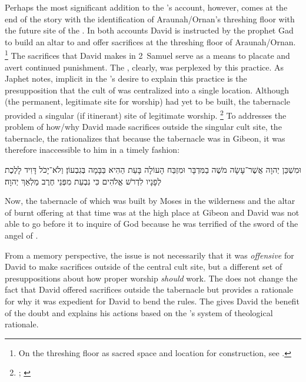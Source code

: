 Perhaps the most significant addition to the \chronicler's account, however, comes at the end of the story with the identification of Araunah/Ornan's threshing floor with the future site of the \jerusalemtemple. In both accounts David is instructed by the prophet Gad to build an altar to \yahweh and offer sacrifices at the threshing floor of Araunah/Ornan.%
    \footnote{On the threshing floor as  sacred space and location for \temple construction, see 
        \cite[125--144]{waters2015}.}
The sacrifices that David makes in 2~Samuel serve as a means to placate \yahweh and avert continued punishment. The \chronicler, clearly, was perplexed by this practice. As Japhet notes, implicit in the \chronicler's desire to explain this practice is the presupposition that the cult of \yahweh was centralized into a single location. Although \thetemple (the permanent, legitimate site for worship) had yet to be built, the tabernacle provided a singular (if itinerant) site of legitimate worship.%
    \footnote{\Cite[389]{japhet1993}; \cite[760--761]{knoppers2007}}
To addresses the problem of how/why David made sacrifices outside the singular cult site, the tabernacle, the \chronicler rationalizes that because the tabernacle was in Gibeon, it was therefore inaccessible to him in a timely fashion:
\begin{hebrewtext}
    וּמִשְׁכַּן יְהוָה אֲשֶׁר־עָשָׂה מֹשֶׁה בַמִּדְבָּר וּמִזְבַּח הָעוֹלָה בָּעֵת הַהִיא בַּבָּמָה בְּגִבְעוֹן׃ 
    וְלֹא־יָכֹל דָּוִיד לָלֶכֶת לְפָנָיו לִדְרֹשׁ אֱלֹהִים כִּי נִבְעַת מִפְּנֵי חֶרֶב מַלְאַךְ יְהוָה׃
\end{hebrewtext}
\begin{translation}
    Now, the tabernacle of \yahweh which was built by Moses in the wilderness and the altar of burnt offering at that time was at the high place at Gibeon
    and David was not able to go before it to inquire of God because he was terrified of the sword of the angel of \yahweh.
\end{translation}
\noindent
From a memory perspective, the issue is not necessarily that it was \emph{offensive} for David to make sacrifices outside of the central cult site, but a different set of presuppositions about how proper worship \emph{should} work. The \chronicler does not change the fact that David offered sacrifices outside the tabernacle but provides a rationale for why it was expedient for David to bend the rules. The \chronicler gives David the benefit of the doubt and explains his actions based on the \chronicler's system of theological rationale.

